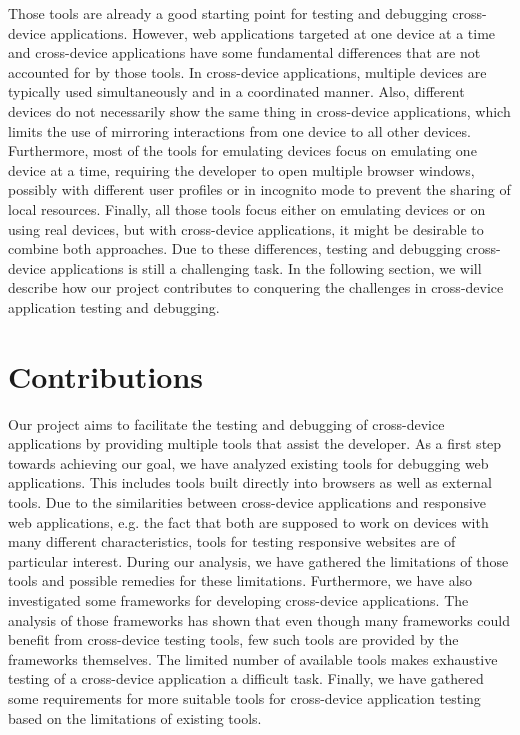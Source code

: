 Those tools are already a good starting point for testing and debugging cross-device applications. However, web applications targeted at one device at a time and cross-device applications have some fundamental differences that are not accounted for by those tools. In cross-device applications, multiple devices are typically used simultaneously and in a coordinated manner. Also, different devices do not necessarily show the same thing in cross-device applications, which limits the use of mirroring interactions from one device to all other devices. Furthermore, most of the tools for emulating devices focus on emulating one device at a time, requiring the developer to open multiple browser windows, possibly with different user profiles or in incognito mode to prevent the sharing of local resources. Finally, all those tools focus either on emulating devices or on using real devices, but with cross-device applications, it might be desirable to combine both approaches. Due to these differences, testing and debugging cross-device applications is still a challenging task. In the following section, we will describe how our project contributes to conquering the challenges in cross-device application testing and debugging.

\section{Contributions}

Our project aims to facilitate the testing and debugging of cross-device applications by providing multiple tools that assist the developer. As a first step towards achieving our goal, we have analyzed existing tools for debugging web applications. This includes tools built directly into browsers as well as external tools. Due to the similarities between cross-device applications and responsive web applications, e.g. the fact that both are supposed to work on devices with many different characteristics, tools for testing responsive websites are of particular interest. During our analysis, we have gathered the limitations of those tools and possible remedies for these limitations. Furthermore, we have also investigated some frameworks for developing cross-device applications. The analysis of those frameworks has shown that even though many frameworks could benefit from cross-device testing tools, few such tools are provided by the frameworks themselves. The limited number of available tools makes exhaustive testing of a cross-device application a difficult task. Finally, we have gathered some requirements for more suitable tools for cross-device application testing based on the limitations of existing tools.

